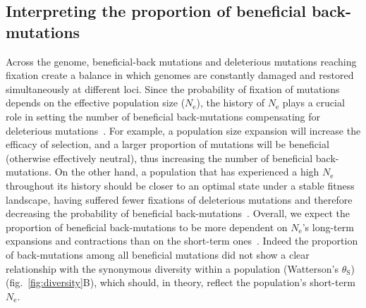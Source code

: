 \documentclass[12pt]{article}
\newcommand{\Ne}{N_{\text{e}}}
\newcommand{\thetaSyn}{\theta_{\text{S}}}
\begin{document}
\subsection*{Interpreting the proportion of beneficial back-mutations}

Across the genome, beneficial-back mutations and deleterious mutations reaching fixation create a balance in which genomes are constantly damaged and restored simultaneously at different loci.
Since the probability of fixation of mutations depends on the effective population size ($\Ne$), the history of $\Ne$ plays a crucial role in setting the number of beneficial back-mutations compensating for deleterious mutations~\cite{latrille_inferring_2021}.
For example, a population size expansion will increase the efficacy of selection, and a larger proportion of mutations will be beneficial (otherwise effectively neutral), thus increasing the number of beneficial back-mutations.
On the other hand, a population that has experienced a high $\Ne$ throughout its history should be closer to an optimal state under a stable fitness landscape, having suffered fewer fixations of deleterious mutations and therefore decreasing the probability of beneficial back-mutations~\cite{huber_determining_2017}.
Overall, we expect the proportion of beneficial back-mutations to be more dependent on $\Ne$’s long-term expansions and contractions than on the short-term ones~\cite{charlesworth_other_2007,huber_determining_2017}.
Indeed the proportion of back-mutations among all beneficial mutations did not show a clear relationship with the synonymous diversity within a population (Watterson's $\thetaSyn$) (fig.~\ref{fig:diversity}B), which should, in theory, reflect the population's short-term $\Ne$.
\end{document}
